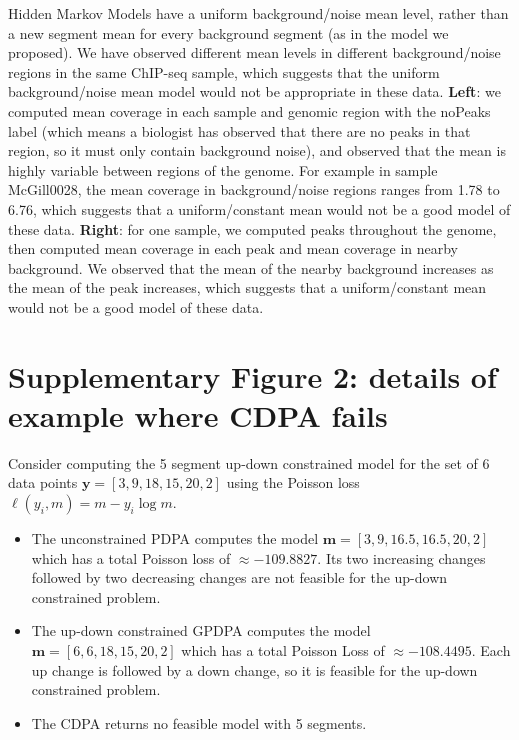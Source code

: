 \documentclass{article}
\begin{document}
Hidden Markov Models have a uniform background/noise mean
level, rather than a new segment mean for every background segment (as
in the model we proposed). We have observed different mean levels in
different background/noise regions in the same ChIP-seq sample, which
suggests that the uniform background/noise mean model would not be
appropriate in these data.  \textbf{Left}: we computed mean coverage
in each sample and genomic region with the noPeaks label (which means
a biologist has observed that there are no peaks in that region, so it
must only contain background noise), and observed that the mean is
highly variable between regions of the genome. For example in sample
McGill0028, the mean coverage in background/noise regions ranges from
1.78 to 6.76, which suggests that a uniform/constant mean would not be
a good model of these data. \textbf{Right}: for one sample, we
computed peaks throughout the genome, then computed mean coverage in
each peak and mean coverage in nearby background. We observed that the
mean of the nearby background increases as the mean of the peak
increases, which suggests that a uniform/constant mean would not be a
good model of these data.
\newpage
\section*{Supplementary Figure 2: details of example where CDPA fails}

Consider computing the 5 segment up-down constrained model for the set
of 6 data points $\mathbf y = [3, 9, 18, 15, 20, 2]$ using the Poisson loss
$\ell(y_i, m)=m-y_i\log m$. 
\begin{itemize}
\item The unconstrained PDPA computes the model $\mathbf m = [3, 9, 16.5, 16.5, 20,
  2]$ which has a total Poisson loss of $\approx -109.8827$. Its two increasing
  changes followed by two decreasing changes are not feasible for the
  up-down constrained problem.
\item The up-down constrained GPDPA computes the model $\mathbf m = [6, 6, 18, 15,
  20, 2]$ which has a total Poisson Loss of $\approx -108.4495$. Each
  up change is followed by a down change, so it is feasible for the
  up-down constrained problem.
\item The CDPA returns no feasible model with 5 segments.
\end{itemize}
\end{document}
